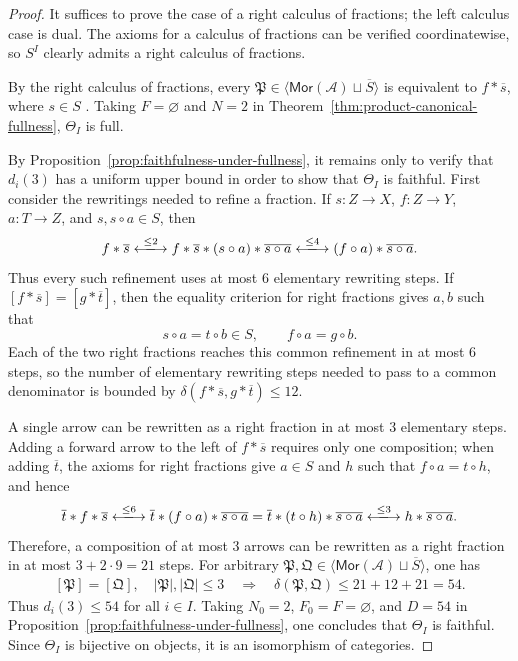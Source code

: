 \documentclass[10pt,a4paper]{amsart}
\theoremstyle{plain}
\theoremstyle{definition}
\theoremstyle{remark}
\begin{document}
\begin{proof}
  It suffices to prove the case of a right calculus of fractions; the left calculus case is dual.
  The axioms for a calculus of fractions can be verified coordinatewise, so $S^I$ clearly admits a right calculus of fractions.

  \medskip
  By the right calculus of fractions, every $\mathfrak P\in\langle\mathsf{Mor}(\mathcal A)\sqcup\overline S\rangle$ is equivalent to $f\ast\overline s$, where $s\in S$ \cite[Chapter~I, \S~2.4, p.~14]{GabrielZisman}.
  Taking $F=\varnothing$ and $N=2$ in Theorem~\ref{thm:product-canonical-fullness}, $\Theta_I$ is full.

  \medskip

  By Proposition~\ref{prop:faithfulness-under-fullness}, it remains only to verify that $d_i(3)$ has a uniform upper bound in order to show that $\Theta_I$ is faithful.
  First consider the rewritings needed to refine a fraction.
  If $s:Z\longrightarrow X$, $f:Z\longrightarrow Y$, $a:T\longrightarrow Z$, and $s,s\circ a\in S$, then
  \[
    f\ast\overline s
    \xlongleftrightarrow{\leq2}
    f\ast\overline s\ast(s\circ a)\ast\overline{s\circ a}\xlongleftrightarrow{\leq4}
    (f\circ a)\ast\overline{s\circ a}.
  \]
  Thus every such refinement uses at most $6$ elementary rewriting steps.
  If $[f\ast\overline s]=[g\ast\overline t]$, then the equality criterion for right fractions \cite[Chapter~I, \S\S~2.3--2.4, pp.~13--14]{GabrielZisman} gives $a,b$ such that
  \[
    s\circ a=t\circ b\in S,
    \qquad f\circ a=g\circ b.
  \]
  Each of the two right fractions reaches this common refinement in at most $6$ steps, so the number of elementary rewriting steps needed to pass to a common denominator is bounded by $\delta(f\ast\overline s,g\ast\overline t)\leq12$.

  A single arrow can be rewritten as a right fraction in at most $3$ elementary steps.
  Adding a forward arrow to the left of $f\ast\overline s$ requires only one composition; when adding $\overline t$, the axioms for right fractions give $a\in S$ and $h$ such that $f\circ a=t\circ h$, and hence
  \[
    \overline t\ast f\ast\overline s
    \xlongleftrightarrow{\leq6}
    \overline t\ast(f\circ a)\ast\overline{s\circ a}=\overline t\ast(t\circ h)\ast\overline{s\circ a}
    \xlongleftrightarrow{\leq3}
    h\ast\overline{s\circ a}.
  \]
  Therefore, a composition of at most $3$ arrows can be rewritten as a right fraction in at most $3+2\cdot9=21$ steps.
  For arbitrary $\mathfrak P,\mathfrak Q\in \langle\mathsf{Mor}(\mathcal A)\sqcup\overline S\rangle$, one has
  \[
    \begin{gathered}
      [\mathfrak P]=[\mathfrak Q],\quad
      |\mathfrak P|,|\mathfrak Q|\leq3
      \quad\Longrightarrow\quad
      \delta(\mathfrak P,\mathfrak Q)\leq21+12+21=54.
    \end{gathered}
  \]
  Thus $d_i(3)\leq54$ for all $i\in I$.
  Taking $N_0=2$, $F_0=F=\varnothing$, and $D=54$ in Proposition~\ref{prop:faithfulness-under-fullness}, one concludes that $\Theta_I$ is faithful.
  Since $\Theta_I$ is bijective on objects, it is an isomorphism of categories.


\end{proof}
\end{document}
